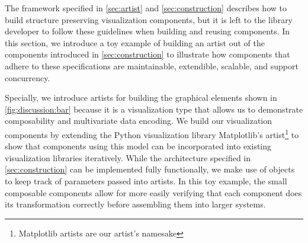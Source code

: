 \documentclass[review]{vgtc}
\theoremstyle{definition}
\theoremstyle{remark}
\begin{document}
The framework specified in \autoref{sec:artist} and \autoref{sec:construction} describes how to build structure preserving visualization components, but it is left to the library developer to follow these guidelines when building and reusing components. In this section, we introduce a toy example of building an artist out of the components introduced in \autoref{sec:construction} to illustrate how components that adhere to these specifications are maintainable, extendible, scalable, and support concurrency.

\begin{figure}[H]
  \centering
  \label{fig:discussion:bar}
\end{figure}

Specially, we introduce artists for building the graphical elements shown in \autoref{fig:discussion:bar} because it is a visualization type that allows us to demonstrate composability and multivariate data encoding. We build our visualization components by extending the Python visualization library Matplotlib's artist\footnote{Matplotlib artists are our artist's namesake}\cite{hunterMatplotlib2DGraphics2007,hunterArchitectureOpenSource} to show that components using this model can be incorporated into existing visualization libraries iteratively. While the architecture specified in \autoref{sec:construction} can be implemented fully functionally, we make use of objects to keep track of parameters passed into artists. In this toy example, the small composable components allow for more easily verifying that each component does its transformation correctly before assembling them into larger systems.
\end{document}
